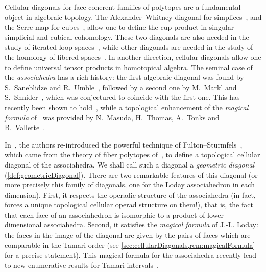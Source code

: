 \documentclass{amsart}
\theoremstyle{definition}
\begin{document}


Cellular diagonals for face-coherent families of polytopes are a fundamental object in algebraic topology. 
The Alexander--Whitney diagonal for simplices~\cite{EilenbergMacLane}, and the Serre map for cubes~\cite{Serre}, allow one to define the cup product in singular simplicial and cubical cohomology. 
These two diagonals are also needed in the study of iterated loop spaces~\cite{Baues}, while other diagonals are needed in the study of the homology of fibered spaces~\cite{Saneblidze-freeLoopFibration,SaneblidzeRivera, Proute}. 
In another direction, cellular diagonals allow one to define universal tensor products in homotopical algebra. 
The seminal case of the \emph{associahedra} has a rich history: the first algebraic diagonal was found by S.~Saneblidze and R.~Umble~\cite{SaneblidzeUmble}, followed by a second one by M.~Markl and S.~Shnider~\cite{MarklShnider}, which was conjectured to coincide with the first one. 
This has recently been shown to hold~\cite{SaneblidzeUmble-comparingDiagonals}, while a topological enhancement of the \emph{magical formula} of~\cite{MarklShnider} was provided by N.~Masuda, H.~Thomas, A.~Tonks and B.~Vallette~\cite{MasudaThomasTonksVallette}.

In~\cite{MasudaThomasTonksVallette}, the authors re-introduced the powerful technique of Fulton--Sturmfels~\cite{FultonSturmfels}, which came from the theory of fiber polytopes of~\cite{BilleraSturmfels}, to define a topological cellular diagonal of the associahedra.
We shall call such a diagonal a \emph{geometric diagonal} (\cref{def:geometricDiagonal}).
There are two remarkable features of this diagonal (or more precisely this family of diagonals, one for the Loday associahedron in each dimension).
First, it respects the operadic structure of the associahedra (in fact, forces a unique topological cellular operad structure on them!), that is, the fact that each face of an associahedron is isomorphic to a product of lower-dimensional associahedra.
Second, it satisfies the \emph{magical formula} of J.-L. Loday: the faces in the image of the diagonal are given by the pairs of faces which are comparable in the Tamari order (see \cref{sec:cellularDiagonals,rem:magicalFormula} for a precise statement). 
This magical formula for the associahedra recently lead to new enumerative results for Tamari intervals~\cite{BostanChyzakPilaud}.
\end{document}
